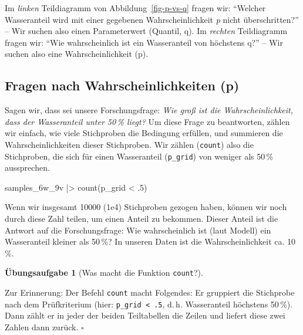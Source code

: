 \documentclass[
  ngerman,
  letterpaper,
  twoside,
  open=any]{scrbook}
\newenvironment{Shaded}{\begin{snugshade}}{\end{snugshade}}
\newcommand{\DecValTok}[1]{\textcolor[rgb]{0.68,0.00,0.00}{#1}}
\newcommand{\FunctionTok}[1]{\textcolor[rgb]{0.28,0.35,0.67}{#1}}
\newcommand{\NormalTok}[1]{\textcolor[rgb]{0.00,0.23,0.31}{#1}}
\newcommand{\SpecialCharTok}[1]{\textcolor[rgb]{0.37,0.37,0.37}{#1}}
\theoremstyle{definition}
\theoremstyle{plain}
\theoremstyle{definition}
\newtheorem{exercise}{Übungsaufgabe}[chapter]
\theoremstyle{definition}
\theoremstyle{definition}
\theoremstyle{definition}
\newtheorem{exercise}{Übungsaufgabe}[chapter]
\theoremstyle{remark}
\begin{document}
Im \emph{linken} Teildiagramm von Abbildung~\ref{fig-p-vs-q} fragen wir:
\enquote{Welcher Wasseranteil wird mit einer gegebenen
Wahrscheinlichkeit \emph{p} nicht überschritten?} -- Wir suchen also
einen Parameterwert (Quantil, q). Im \emph{rechten} Teildiagramm fragen
wir: \enquote{Wie wahrscheinlich ist ein Wasseranteil von höchstens q?}
-- Wir suchen also eine Wahrscheinlichkeit (p).

\subsection{Fragen nach Wahrscheinlichkeiten
(p)}\label{fragen-nach-wahrscheinlichkeiten-p}

Sagen wir, dass sei unsere Forschungsfrage: \emph{Wie groß ist die
Wahrscheinlichkeit, dass der Wasseranteil unter 50\,\% liegt?} Um diese
Frage zu beantworten, zählen wir einfach, wie viele Stichproben die
Bedingung erfüllen, und summieren die Wahrscheinlichkeiten dieser
Stichproben. Wir zählen (\texttt{count}) also die Stichproben, die sich
für einen Wasseranteil (\texttt{p\_grid}) von weniger als 50\,\%
aussprechen.

\begin{Shaded}
\begin{Highlighting}[]
\NormalTok{samples\_6w\_9v }\SpecialCharTok{|\textgreater{}}
  \FunctionTok{count}\NormalTok{(p\_grid }\SpecialCharTok{\textless{}}\NormalTok{ .}\DecValTok{5}\NormalTok{) }
\end{Highlighting}
\end{Shaded}

Wenn wir insgesamt 10000 (1e4) Stichproben gezogen haben, können wir
noch durch diese Zahl teilen, um einen Anteil zu bekommen. Dieser Anteil
ist die Antwort auf die Forschungsfrage: Wie wahrscheinlich ist (laut
Modell) ein Wasseranteil kleiner als 50\,\%? In unseren Daten ist die
Wahrscheinlichkeit ca. 10\,\%.

\begin{exercise}[Was macht die Funktion
\texttt{count}?]\protect\hypertarget{exr-count}{}\label{exr-count}

Zur Erinnerung: Der Befehl \texttt{count} macht Folgendes: Er gruppiert
die Stichprobe nach dem Prüfkriterium (hier:
\texttt{p\_grid\ \textless{}\ .5}, d.\,h. Wasseranteil höchstens
50\,\%). Dann zählt er in jeder der beiden Teiltabellen die Zeilen und
liefert diese zwei Zahlen dann zurück. \(\square\)

\end{exercise}
\end{document}
